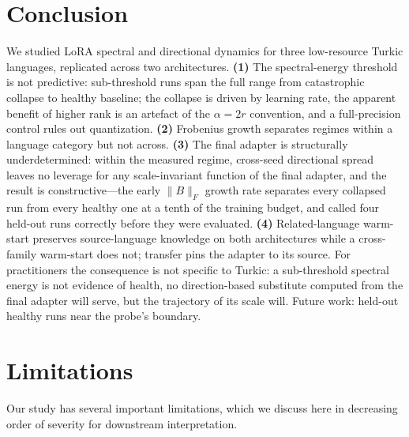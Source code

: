 \documentclass[11pt]{article}
\begin{document}
\section{Conclusion}

We studied LoRA spectral and directional dynamics for three low-resource Turkic languages, replicated across two architectures. \textbf{(1)} The spectral-energy threshold is not predictive: sub-threshold runs span the full range from catastrophic collapse to healthy baseline; the collapse is driven by learning rate, the apparent benefit of higher rank is an artefact of the $\alpha{=}2r$ convention, and a full-precision control rules out quantization. \textbf{(2)} Frobenius growth separates regimes within a language category but not across. \textbf{(3)} The final adapter is structurally underdetermined: within the measured regime, cross-seed directional spread leaves no leverage for any scale-invariant function of the final adapter, and the result is constructive---the early $\|B\|_F$ growth rate separates every collapsed run from every healthy one at a tenth of the training budget, and called four held-out runs correctly before they were evaluated. \textbf{(4)} Related-language warm-start preserves source-language knowledge on both architectures while a cross-family warm-start does not; transfer pins the adapter to its source. For practitioners the consequence is not specific to Turkic: a sub-threshold spectral energy is not evidence of health, no direction-based substitute computed from the final adapter will serve, but the trajectory of its scale will. Future work: held-out healthy runs near the probe's boundary.

\section*{Limitations}
\label{sec:limitations}

Our study has several important limitations, which we discuss here in decreasing order of severity for downstream interpretation.
\end{document}
